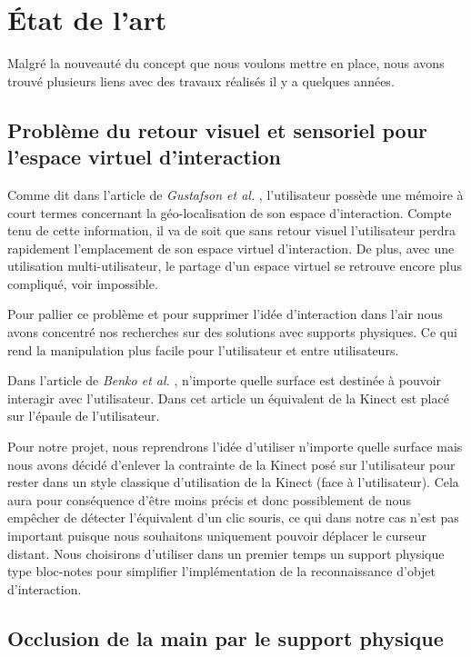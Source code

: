 \chapter{État de l’art}

Malgré la nouveauté du concept que nous voulons mettre en place, nous avons trouvé plusieurs liens avec des travaux réalisés il y a quelques années.

\section{Problème du retour visuel et sensoriel pour l’espace virtuel d’interaction}

Comme dit dans l’article de \textit{Gustafson et al.} \cite{Gustafson:2010:IIS:1866029.1866033}, l’utilisateur possède une mémoire à court termes concernant la géo-localisation de son espace d’interaction. Compte tenu de cette information, il va de soit que sans retour visuel l’utilisateur perdra rapidement l’emplacement de son espace virtuel d’interaction. De plus, avec une utilisation multi-utilisateur, le partage d’un espace virtuel se retrouve encore plus compliqué, voir impossible. 

Pour pallier ce problème et pour supprimer l’idée d’interaction dans l’air nous avons concentré nos recherches sur des solutions avec supports physiques. Ce qui rend la manipulation plus facile pour l’utilisateur et entre utilisateurs.

Dans l’article de \textit{Benko et al.} \cite{kinect-wear}, n’importe quelle surface est destinée à pouvoir interagir avec l’utilisateur. Dans cet article un équivalent de la Kinect est placé sur l’épaule de l’utilisateur. 

Pour notre projet, nous reprendrons l’idée d’utiliser n’importe quelle surface mais nous avons décidé d’enlever la contrainte de la Kinect posé sur l’utilisateur pour rester dans un style classique d’utilisation de la Kinect (face à l’utilisateur). Cela aura pour conséquence d'être moins précis et donc possiblement de nous empêcher de détecter l’équivalent d’un clic souris, ce qui dans notre cas n’est pas important puisque nous souhaitons uniquement pouvoir déplacer le curseur distant. Nous choisirons d’utiliser dans un premier temps un support physique type bloc-notes pour simplifier l’implémentation de la reconnaissance d’objet d’interaction.

\section{Occlusion de la main par le support physique}

